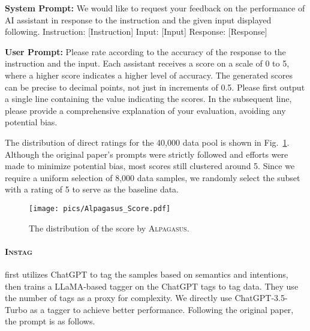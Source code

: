 \begin{promptbox}
    \vspace{-0.2cm}
    \textbf{System Prompt:}\newline
    We would like to request your feedback on the performance of AI assistant in response to the instruction and the given input displayed following.\newline\newline
    Instruction: [Instruction]\newline
    Input: [Input]\newline
    Response: [Response]\newline
    
    \textbf{User Prompt:}\newline
    Please rate according to the accuracy of the response to the instruction and the input. Each assistant receives a score on a scale of 0 to 5, where a higher score indicates a higher level of accuracy. The generated scores can be precise to decimal points, not just in increments of 0.5. Please first output a single line containing the value indicating the scores. In the subsequent line, please provide a comprehensive explanation of your evaluation, avoiding any potential bias.
\end{promptbox}

The distribution of direct ratings for the 40,000 data pool is shown in Fig.~\ref{fig:Alpagasus}. Although the original paper's prompts were strictly followed and efforts were made to minimize potential bias, most scores still clustered around 5. Since we require a uniform selection of 8,000 data samples, we randomly select the subset with a rating of 5 to serve as the baseline data.

\begin{figure}[h]
\centering
\texttt{[image: pics/Alpagasus\_Score.pdf]}
\caption{The distribution of the score by \textsc{Alpagasus}.}
\label{fig:Alpagasus}
\end{figure}

\paragraph{\textsc{Instag~\cite{lu2023instag}}} first utilizes ChatGPT to tag the samples based on semantics and intentions, then trains a LLaMA-based tagger on the ChatGPT tags to tag data. They use the number of tags as a proxy for complexity. We directly use ChatGPT-3.5-Turbo as a tagger to achieve better performance. Following the original paper, the prompt is as follows.

